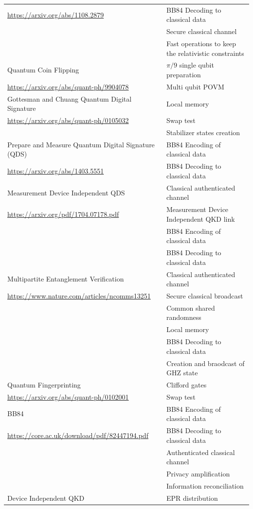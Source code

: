 \documentclass[11pt]{article}
\begin{document}
\begin{longtable}{p{}|p{}}
\url{https://arxiv.org/abs/1108.2879} & BB84 Decoding to classical data\\
 & Secure classical channel\\
 & Fast operations to keep the relativistic constraints\\
\hline
Quantum Coin Flipping & \(\pi/9\) single qubit preparation\\
\url{https://arxiv.org/abs/quant-ph/9904078} & Multi qubit POVM\\
\hline
Gottesman and Chuang Quantum Digital Signature & Local memory\\
\url{https://arxiv.org/abs/quant-ph/0105032} & Swap test\\
 & Stabilizer states creation\\
\hline
Prepare and Measure Quantum Digital Signature (QDS) & BB84 Encoding of classical data\\
\url{https://arxiv.org/abs/1403.5551} & BB84 Decoding to classical data\\
\hline
Measurement Device Independent QDS & Classical authenticated channel\\
\url{https://arxiv.org/pdf/1704.07178.pdf} & Measurement Device Independent QKD link\\
 & BB84 Encoding of classical data\\
 & BB84 Decoding to classical data\\
\hline
Multipartite Entanglement Verification & Classical authenticated channel\\
\url{https://www.nature.com/articles/ncomms13251} & Secure classical broadcast\\
 & Common shared randomness\\
 & Local memory\\
 & BB84 Decoding to classical data\\
 & Creation and braodcast of GHZ state\\
\hline
Quantum Fingerprinting & Clifford gates\\
\url{https://arxiv.org/abs/quant-ph/0102001} & Swap test\\
\hline
BB84 & BB84 Encoding of classical data\\
\url{https://core.ac.uk/download/pdf/82447194.pdf} & BB84 Decoding to classical data\\
 & Authenticated classical channel\\
 & Privacy amplification\\
 & Information reconciliation\\
\hline
Device Independent QKD & EPR distribution\\

\end{longtable}
\end{document}
